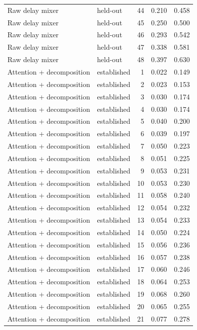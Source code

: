 \begin{tabular}{llrrr}
Raw delay mixer & held-out & 44 & 0.210 & 0.458 \\
Raw delay mixer & held-out & 45 & 0.250 & 0.500 \\
Raw delay mixer & held-out & 46 & 0.293 & 0.542 \\
Raw delay mixer & held-out & 47 & 0.338 & 0.581 \\
Raw delay mixer & held-out & 48 & 0.397 & 0.630 \\
Attention + decomposition & established & 1 & 0.022 & 0.149 \\
Attention + decomposition & established & 2 & 0.023 & 0.153 \\
Attention + decomposition & established & 3 & 0.030 & 0.174 \\
Attention + decomposition & established & 4 & 0.030 & 0.174 \\
Attention + decomposition & established & 5 & 0.040 & 0.200 \\
Attention + decomposition & established & 6 & 0.039 & 0.197 \\
Attention + decomposition & established & 7 & 0.050 & 0.223 \\
Attention + decomposition & established & 8 & 0.051 & 0.225 \\
Attention + decomposition & established & 9 & 0.053 & 0.231 \\
Attention + decomposition & established & 10 & 0.053 & 0.230 \\
Attention + decomposition & established & 11 & 0.058 & 0.240 \\
Attention + decomposition & established & 12 & 0.054 & 0.232 \\
Attention + decomposition & established & 13 & 0.054 & 0.233 \\
Attention + decomposition & established & 14 & 0.050 & 0.224 \\
Attention + decomposition & established & 15 & 0.056 & 0.236 \\
Attention + decomposition & established & 16 & 0.057 & 0.238 \\
Attention + decomposition & established & 17 & 0.060 & 0.246 \\
Attention + decomposition & established & 18 & 0.064 & 0.253 \\
Attention + decomposition & established & 19 & 0.068 & 0.260 \\
Attention + decomposition & established & 20 & 0.065 & 0.255 \\
Attention + decomposition & established & 21 & 0.077 & 0.278 \\

\end{tabular}
